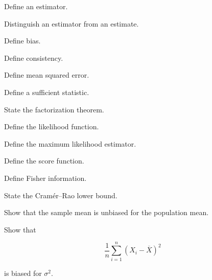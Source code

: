 \begin{exercise}[1]
Define an estimator.
\end{exercise}

\begin{exercise}[1]
Distinguish an estimator from an estimate.
\end{exercise}

\begin{exercise}[1]
Define bias.
\end{exercise}

\begin{exercise}[1]
Define consistency.
\end{exercise}

\begin{exercise}[1]
Define mean squared error.
\end{exercise}

\begin{exercise}[1]
Define a sufficient statistic.
\end{exercise}

\begin{exercise}[1]
State the factorization theorem.
\end{exercise}

\begin{exercise}[1]
Define the likelihood function.
\end{exercise}

\begin{exercise}[1]
Define the maximum likelihood estimator.
\end{exercise}

\begin{exercise}[1]
Define the score function.
\end{exercise}

\begin{exercise}[1]
Define Fisher information.
\end{exercise}

\begin{exercise}[1]
State the Cram\'er--Rao lower bound.
\end{exercise}

\begin{exercise}[2]
Show that the sample mean is unbiased for the population mean.
\end{exercise}

\begin{exercise}[2]
Show that

\[
\frac1n
\sum_{i=1}^{n}
(X_i-\overline{X})^2
\]

is biased for \(\sigma^2\).
\end{exercise}

